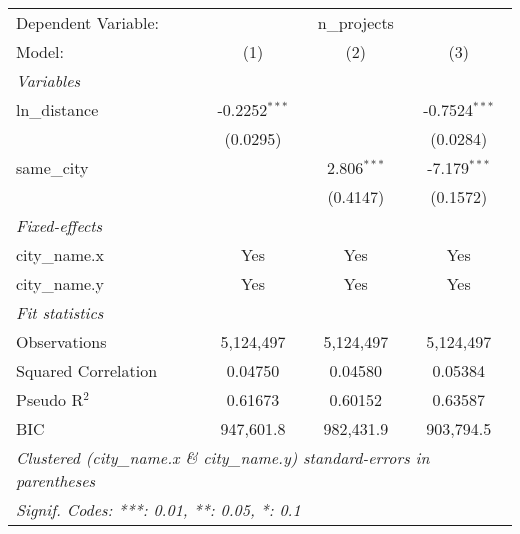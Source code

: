 
\begingroup
\centering
\begin{tabular}{lccc}
   \tabularnewline \midrule \midrule
   Dependent Variable: & \multicolumn{3}{c}{n\_projects}\\
   Model:              & (1)             & (2)           & (3)\\  
   \midrule
   \emph{Variables}\\
   ln\_distance        & -0.2252$^{***}$ &               & -0.7524$^{***}$\\   
                       & (0.0295)        &               & (0.0284)\\   
   same\_city          &                 & 2.806$^{***}$ & -7.179$^{***}$\\   
                       &                 & (0.4147)      & (0.1572)\\   
   \midrule
   \emph{Fixed-effects}\\
   city\_name.x        & Yes             & Yes           & Yes\\  
   city\_name.y        & Yes             & Yes           & Yes\\  
   \midrule
   \emph{Fit statistics}\\
   Observations        & 5,124,497       & 5,124,497     & 5,124,497\\  
   Squared Correlation & 0.04750         & 0.04580       & 0.05384\\  
   Pseudo R$^2$        & 0.61673         & 0.60152       & 0.63587\\  
   BIC                 & 947,601.8       & 982,431.9     & 903,794.5\\  
   \midrule \midrule
   \multicolumn{4}{l}{\emph{Clustered (city\_name.x \& city\_name.y) standard-errors in parentheses}}\\
   \multicolumn{4}{l}{\emph{Signif. Codes: ***: 0.01, **: 0.05, *: 0.1}}\\
\end{tabular}
\par\endgroup


